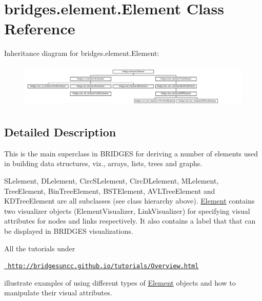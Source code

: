 \hypertarget{classbridges_1_1element_1_1_element}{}\section{bridges.\+element.\+Element Class Reference}
\label{classbridges_1_1element_1_1_element}
Inheritance diagram for bridges.\+element.\+Element\+:\begin{figure}[H]
\begin{center}
\leavevmode
\includegraphics[height=2.145594cm]{classbridges_1_1element_1_1_element}
\end{center}
\end{figure}


\subsection{Detailed Description}
This is the main superclass in B\+R\+I\+D\+G\+ES for deriving a number of elements used in building data structures, viz., arrays, lists, trees and graphs. 

S\+Lelement, D\+Lelement, Circ\+S\+Lelement, Circ\+D\+Lelement, M\+Lelement, Tree\+Element, Bin\+Tree\+Element, B\+S\+T\+Element, A\+V\+L\+Tree\+Element and K\+D\+Tree\+Element are all subclasses (see class hierarchy above). \mbox{\hyperlink{classbridges_1_1element_1_1_element}{Element}} contains two visualizer objects (Element\+Visualizer, Link\+Visualizer) for specifying visual attributes for nodes and links respectively. It also contains a label that that can be displayed in B\+R\+I\+D\+G\+ES visualizations.

All the tutorials under

\href{http://bridgesuncc.github.io/tutorials/Overview.html}{\texttt{ http\+://bridgesuncc.\+github.\+io/tutorials/\+Overview.\+html}}

illustrate examples of using different types of \mbox{\hyperlink{classbridges_1_1element_1_1_element}{Element}} objects and how to manipulate their visual attributes.

